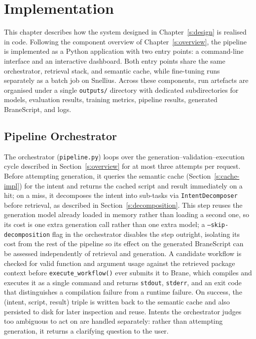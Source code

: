 \chapter{Implementation}\label{s:implementation}

This chapter describes how the system designed in Chapter~\ref{s:design} is
realised in code. Following the component overview of
Chapter~\ref{s:overview}, the pipeline is implemented as a Python
application with two entry points: a command-line interface and an
interactive dashboard. Both entry points share the same orchestrator,
retrieval stack, and semantic cache, while fine-tuning runs separately as a
batch job on Snellius. Across these components, run artefacts are organised
under a single \texttt{outputs/} directory with dedicated subdirectories for
models, evaluation results, training metrics, pipeline results, generated
BraneScript, and logs.

\section{Pipeline Orchestrator}\label{s:pipeline-impl}

The orchestrator (\texttt{pipeline.py}) loops over the
generation--validation--execution cycle described in
Section~\ref{s:overview} for at most three attempts per request. Before
attempting generation, it queries the semantic cache
(Section~\ref{s:cache-impl}) for the intent and returns the cached script and
result immediately on a hit; on a miss, it decomposes the intent into
sub-tasks via \texttt{IntentDecomposer} before retrieval, as described in
Section~\ref{s:decomposition}. This step reuses the generation model already loaded in
memory rather than loading a second one, so its cost is one extra generation
call rather than one extra model; a \texttt{--skip-decomposition} flag in the orchestrator
disables the step outright, isolating its cost from the rest of the pipeline so its
effect on the generated BraneScript can be assessed independently of retrieval and
generation. A candidate workflow is checked for valid function
and argument usage against the retrieved package context before
\texttt{execute\_workflow()} ever submits it to Brane, which compiles and
executes it as a single command and returns \texttt{stdout},
\texttt{stderr}, and an exit code that distinguishes a compilation failure
from a runtime failure. On success, the (intent, script, result) triple is
written back to the semantic cache and also persisted to disk for later
inspection and reuse. Intents the
orchestrator judges too ambiguous to act on are handled separately: rather
than attempting generation, it returns a clarifying question to the user.

